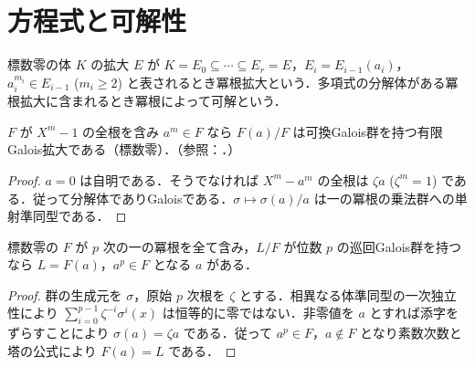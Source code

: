 \section{方程式と可解性}
\begin{defn}[冪根による可解性]
標数零の体 $K$ の拡大 $E$ が $K=E_0\subseteq\cdots\subseteq E_r=E$，$E_i=E_{i-1}(a_i)$，$a_i^{m_i}\in E_{i-1}$ ($m_i\geq2$) と表されるとき冪根拡大という．多項式の分解体がある冪根拡大に含まれるとき冪根によって可解という．
\end{defn}
\begin{prop}[一の冪根を含む体上の冪根添加]
$F$ が $X^m-1$ の全根を含み $a^m\in F$ なら $F(a)/F$ は可換Galois群を持つ有限Galois拡大である（標数零）．（参照：．）
\end{prop}
\begin{proof}
$a=0$ は自明である．そうでなければ $X^m-a^m$ の全根は $\zeta a$ ($\zeta^m=1$) である．従って分解体でありGaloisである．$\sigma\mapsto\sigma(a)/a$ は一の冪根の乗法群への単射準同型である．
\end{proof}
\begin{prop}[素数次数巡回拡大]
標数零の $F$ が $p$ 次の一の冪根を全て含み，$L/F$ が位数 $p$ の巡回Galois群を持つなら $L=F(a)$，$a^p\in F$ となる $a$ がある．
\end{prop}
\begin{proof}
群の生成元を $\sigma$，原始 $p$ 次根を $\zeta$ とする．相異なる体準同型の一次独立性により $\sum_{i=0}^{p-1}\zeta^{-i}\sigma^i(x)$ は恒等的に零ではない．非零値を $a$ とすれば添字をずらすことにより $\sigma(a)=\zeta a$ である．従って $a^p\in F$，$a\notin F$ となり素数次数と塔の公式により $F(a)=L$ である．
\end{proof}
